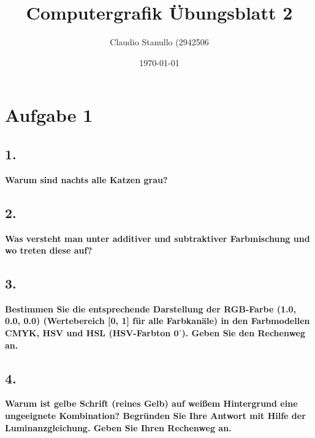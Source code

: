 \documentclass[12pt,pdftex,a4paper]{article}
\title{Computergrafik Übungsblatt 2}
\author{Claudio Stanullo (2942506}
\date{\today}
\begin{document}
\maketitle
\section*{Aufgabe 1}
\subsection*{1.}
\textbf{Warum sind nachts alle Katzen grau?}
\subsection*{2.}
\textbf{Was versteht man unter additiver und subtraktiver Farbmischung und wo treten diese auf?}
\subsection*{3.}
\textbf{Bestimmen Sie die entsprechende Darstellung der RGB-Farbe (1.0, 0.0, 0.0) (Wertebereich [0, 1] für alle Farbkanäle) in den Farbmodellen CMYK, HSV und HSL (HSV-Farbton $\boldsymbol{0^\circ}$). Geben Sie den Rechenweg an.}
\subsection*{4.}
\textbf{Warum ist gelbe Schrift (reines Gelb) auf weißem Hintergrund eine ungeeignete Kombination? Begründen Sie Ihre Antwort mit Hilfe der Luminanzgleichung. Geben Sie Ihren Rechenweg an.}
\end{document}
